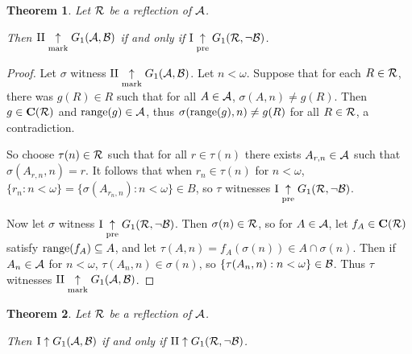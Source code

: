 \documentclass{amsart}
\theoremstyle{plain}
\newtheorem{theorem}{Theorem}
\theoremstyle{definition}
\theoremstyle{remark}
\theoremstyle{plain}
\theoremstyle{definition}
\theoremstyle{remark}
\begin{document}
\begin{theorem}
  Let \(\mathcal{R}\) be a reflection of \(\mathcal{A}\). 

  Then
  \(\mathrm{II}\underset{\text{mark}}{\uparrow}G_{1}(\mathcal{A},\mathcal{B})\) if and only if
  \(\mathrm{I}\underset{\text{pre}}{\uparrow}G_{1}(\mathcal{R},\neg\mathcal{B})\).
\end{theorem}

\begin{proof}
  Let \(\sigma\) witness 
  \(\mathrm{II}\underset{\text{mark}}{\uparrow}G_{1}(\mathcal{A},\mathcal{B})\).
  Let \(n<\omega\). Suppose that for each \(R\in\mathcal{R}\),
  there was \(g(R)\in R\) such that for all \(A\in \mathcal{A}\),
  \(\sigma(A,n)\not=g(R)\). Then \(g\in\mathbf C(\mathcal{R})\)
  and \(\text{range}(g)\in\mathcal{A}\),
  thus \(\sigma(\text{range}(g),n)\not=g(R)\) for all \(R\in\mathcal{R}\),
  a contradiction.

  So choose \(\tau(n)\in\mathcal{R}\) such that for all \(r\in \tau(n)\)
  there exists \(A_{r,n}\in\mathcal{A}\) such that \(\sigma(A_{r,n},n)=r\).
  It follows that when \(r_n\in\tau(n)\) for \(n<\omega\),
  \(\{r_n:n<\omega\}=\{\sigma(A_{r_n,n}):n<\omega\}\in B\),
  so \(\tau\) witnesses
  \(\mathrm{I}\underset{\text{pre}}{\uparrow}G_{1}(\mathcal{R},\neg\mathcal{B})\).

  Now let \(\sigma\) witness 
  \(\mathrm{I}\underset{\text{pre}}{\uparrow}G_{1}(\mathcal{R},\neg\mathcal{B})\).
  Then \(\sigma(n)\in\mathcal{R}\), so for \(A\in\mathcal{A}\), let
  \(f_A\in\mathbf C(\mathcal{R})\) satisfy \(\text{range}(f_A)\subseteq A\),
  and let \(\tau(A,n)=f_A(\sigma(n))\in A\cap\sigma(n)\).
  Then if \(A_n\in\mathcal{A}\) for \(n<\omega\), \(\tau(A_n,n)\in\sigma(n)\),
  so \(\{\tau(A_n,n):n<\omega\}\in\mathcal{B}\).
  Thus \(\tau\) witnesses
  \(\mathrm{II}\underset{\text{mark}}{\uparrow}G_{1}(\mathcal{A},\mathcal{B})\).
\end{proof}

\begin{theorem}
  Let \(\mathcal{R}\) be a reflection of \(\mathcal{A}\). 

  Then
  \(\mathrm{I}\uparrow G_{1}(\mathcal{A},\mathcal{B})\) if and only if
  \(\mathrm{II}\uparrow G_{1}(\mathcal{R},\neg\mathcal{B})\).
\end{theorem}
\end{document}
